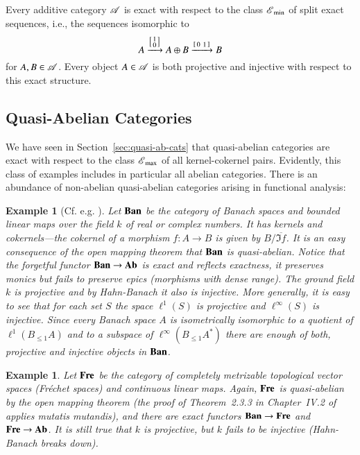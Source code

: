 \documentclass[1p]{elsarticle}
\theoremstyle{mythm}
\theoremstyle{mydef}
\newtheorem{Exm}[Thm]{Example}
\begin{document}
Every additive category $\operatorname{\mathscr{A}}$ is exact with respect to the class
$\operatorname{\mathscr{E}}_{\min}$ of split exact sequences, i.e., the sequences isomorphic to 
\[
A \xrightarrow{\left[\begin{smallmatrix} 1 \\ 0 \end{smallmatrix}\right]} A \oplus B \xrightarrow{\left[\begin{smallmatrix} 0 & 1 \end{smallmatrix}\right]} B
\]
for $A,B \in \operatorname{\mathscr{A}}$. Every object $A \in \operatorname{\mathscr{A}}$ is both projective and
injective with respect to this exact structure.

\subsection{Quasi-Abelian Categories}

We have seen in Section~\ref{sec:quasi-ab-cats} that quasi-abelian
categories are exact with respect to the class $\operatorname{\mathscr{E}}_{\max}$ 
of all kernel-cokernel pairs. Evidently, this class of examples
includes in particular all abelian categories. There is an abundance
of non-abelian quasi-abelian
categories arising in functional analysis:

\begin{Exm}[{Cf. e.g. \cite[IV.2]{mythesis}}]
  Let $\operatorname{\mathbf{Ban}}$ be the category of Banach spaces and bounded linear
  maps over the field $k$ of real or complex numbers. It has kernels
  and cokernels---the cokernel of a morphism $f: A
  \to B$ is given by $B/\overline{\Im{f}}$. It is an easy consequence
  of the open mapping theorem that $\operatorname{\mathbf{Ban}}$ is quasi-abelian. Notice
  that the forgetful functor $\operatorname{\mathbf{Ban}} \to \operatorname{\mathbf{Ab}}$ is exact and
  reflects exactness, it preserves monics but fails to preserve epics
  (morphisms with dense range). The ground field $k$ is projective and
  by Hahn-Banach it also is injective. More generally, it
  is easy to see that for each set $S$ the space $\ell^{1}{(S)}$
  is projective and $\ell^{\infty}{(S)}$ is injective. Since every
  Banach space $A$ is isometrically isomorphic to a quotient of
  $\ell^{1}{(B_{\leq 1}{A})}$ and to a subspace of
  $\ell^{\infty}{(B_{\leq 1} A^{\ast})}$ there are enough of both,
  projective and injective objects in $\operatorname{\mathbf{Ban}}$.
\end{Exm}

\begin{Exm}
  Let $\operatorname{\mathbf{Fre}}$ be the category of completely metrizable topological
  vector spaces (Fr\'echet spaces) and continuous linear maps.
  Again, $\operatorname{\mathbf{Fre}}$ is quasi-abelian by
  the open mapping theorem (the proof of Theorem~2.3.3 in Chapter~IV.2
  of~\cite{mythesis} applies \emph{mutatis mutandis}),
  and there are exact functors
  $\operatorname{\mathbf{Ban}} \to \operatorname{\mathbf{Fre}}$ and $\operatorname{\mathbf{Fre}} \to \operatorname{\mathbf{Ab}}$. It is still true that $k$ is
  projective, but $k$ fails to be injective
  (Hahn-Banach breaks down). 
\end{Exm}
\end{document}
